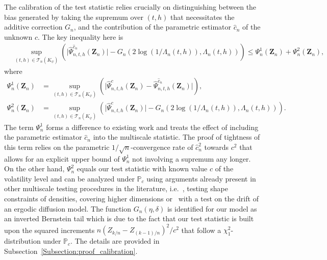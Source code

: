 \documentclass[10.5pt,letter]{article}
\numberwithin{equation}{section}
\theoremstyle{definition}
\renewcommand{\P}{\mathbb{P}}
\newcommand{\1}{\mathbbm{1}}
\begin{document}
The calibration of the test statistic relies crucially on distinguishing between the bias generated by taking the supremum over $(t,h)$ that necessitates the additive correction $G_n$, and the contribution of the parametric estimator $\hat{c}_n$ of the unknown $c$. The key inequality here is
\begin{align}\label{eq:tightnessleftright}
  & \sup_{(t,h)\in\mathcal{T}_n(K_\psi)} \left(\big|\hat{\Psi}_{n,t,h}^{\hat{c}_n}(\mathbf{Z}_n)\big| - G_n\left(2\log(1/\Lambda_n(t,h)), \Lambda_n(t,h)\right)\right) \leq \Psi_n^1(\mathbf{Z}_n) + \Psi_n^2(\mathbf{Z}_n),
\end{align}
where
\begin{align*}
    \Psi_n^1(\mathbf{Z}_n) &= \sup_{(t,h)\in\mathcal{T}_n(K_\psi)} \left(\big|\hat{\Psi}_{n,t,h}^{c} (\mathbf{Z}_n)-\hat{\Psi}_{n,t,h}^{\hat{c}_n}(\mathbf{Z}_n) \big| \right),\\
    \Psi_n^2(\mathbf{Z}_n) &= \sup_{(t,h)\in\mathcal{T}_n(K_\psi)} \left(\big|\hat{\Psi}_{n,t,h}^{c} (\mathbf{Z}_n)\big| - G_n\left(2\log(1/\Lambda_n(t,h)), \Lambda_n(t,h)\right)\right).
\end{align*}
The term $\Psi_n^1$ forms a difference to existing work and treats the effect of including the parametric estimator $\hat{c}_n$ into the multiscale statistic. The proof of tightness of this term relies on the parametric $1/\sqrt{n}$-convergence rate of $\hat{c}_n^2$ towards $c^2$ that allows for an explicit upper bound of $\Psi_n^1$ not involving a supremum any longer. On the other hand, $\Psi_n^2$ equals our test statistic with known value $c$ of the volatility level and can be analyzed under $\P_c$ using arguments already present in other multiscale testing procedures in the literature, i.e.~\cite{Dumbgen_Annals}, \cite{Dumbgen_report} testing shape constraints of densities, \cite{Rohde2009} covering higher dimensions or~\cite{Brutsche/Rohde} with a test on the drift of an ergodic diffusion model. 
The function $G_n(\eta,\delta)$ is identified for our model as an inverted Bernstein tail which is due to the fact that our test statistic is built upon the squared increments $n(Z_{k/n}-Z_{(k-1)/n})^2/c^2$ that follow a $\chi_1^2$-distribution under $\P_c$. The details are provided in Subsection~\ref{Subsection:proof_calibration}.\smallskip
\end{document}
